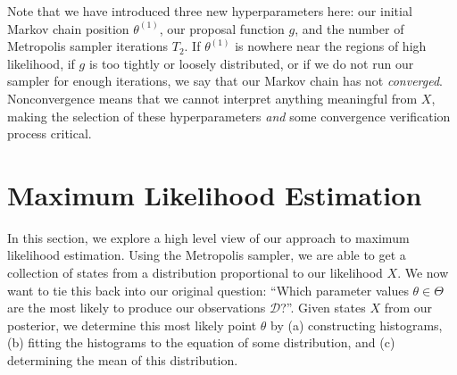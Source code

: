 Note that we have introduced three new hyperparameters here: our initial Markov chain position $\theta^{(1)}$,
our proposal function $g$, and the number of Metropolis sampler iterations $T_2$.
If $\theta^{(1)}$ is nowhere near the regions of high likelihood, if $g$ is too tightly or loosely distributed, or if we
do not run our sampler for enough iterations, we say that our Markov chain has not \emph{converged}.
Nonconvergence means that we cannot interpret anything meaningful from $X$, making the selection of these
hyperparameters \emph{and} some convergence verification process critical.

\section{Maximum Likelihood Estimation}\label{sec:maximumLikelihoodEstimation}
In this section, we explore a high level view of our approach to maximum likelihood estimation.
Using the Metropolis sampler, we are able to get a collection of states from a distribution proportional to our
likelihood $X$.
We now want to tie this back into our original question: ``Which parameter values $\theta \in \Theta$ are the most
likely to produce our observations $\mathcal{D}$?''.
Given states $X$ from our posterior, we determine this most likely point $\theta$ by (a) constructing histograms, (b)
fitting the histograms to the equation of some distribution, and (c) determining the mean of this distribution.

